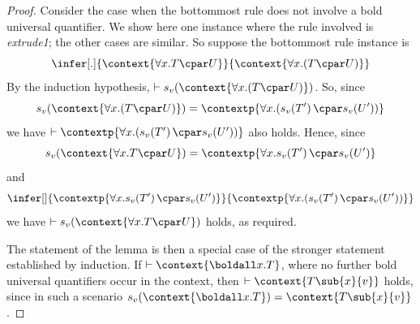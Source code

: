 \documentclass[UKenglish,acmsmall,authorversion]{acmart}
\theoremstyle{plain}
\begin{document}
\begin{proof}
Consider the case when the bottommost rule does not involve a bold universal quantifier.
We show here one instance where the rule involved is \textit{extrude1}; the other cases are similar.
So suppose the bottommost rule instance is 
\[
\infer[.]{
\context{ \forall x. T \cpar U }
}{
\context{ \mathopen{\forall x.} \left( T \cpar U \right) }
}
\]
By the induction hypothesis, $\vdash \mathopen{s_v}\left(\context{ \mathopen{\forall x.} \left( T \cpar U \right) }\right)$.
So, since
\[
\mathopen{s_v}\left(\context{ \mathopen{\forall x.}\left(T \cpar U\right) }\right)
=
\contextp{ \mathopen{\forall x.}\left(\mathopen{s_v}\left(T'\right) \cpar \mathopen{s_v}\left(U'\right)\right) } 
\]
we have $\vdash \contextp{ \mathopen{\forall x.}\left(\mathopen{s_v}\left(T'\right) \cpar \mathopen{s_v}\left(U'\right)\right) }$ also holds.
Hence, since
\[
\mathopen{s_v}\left(\context{ \forall x. T \cpar U }\right) 
= \contextp{ \forall x. \mathopen{s_v}\left(T'\right) \cpar \mathopen{s_v}\left(U'\right) }
\]
and 
\[
\infer[]{
\contextp{ \forall x. \mathopen{s_v}\left(T'\right) \cpar \mathopen{s_v}\left(U'\right) }
}{
\contextp{ \mathopen{\forall x.}\left(\mathopen{s_v}\left(T'\right) \cpar \mathopen{s_v} \left(U'\right)\right) } 
}
\]
we have $\vdash \mathopen{s_v}\left(\context{ \forall x. T \cpar U }\right)$ holds, as required.

The statement of the lemma is then a special case of the stronger statement established by induction. If $\vdash \context{ \boldall x. T }$, where no further bold universal quantifiers occur in the context, then $\vdash \context{ T\sub{x}{v} }$ holds, since in such a scenario $\mathopen{s_v}\left( \context{ \boldall x. T } \right) = \context{ T\sub{x}{v} }$.
\end{proof}
\end{document}
